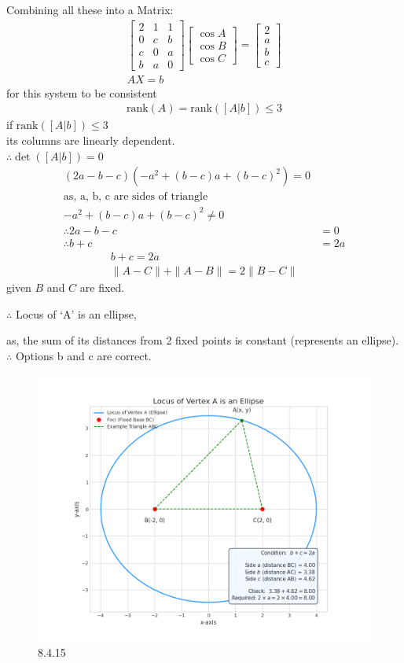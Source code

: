 \documentclass[journal]{IEEEtran}
\begin{document}
Combining all these into a Matrix:
\begin{align}\begin{bmatrix}2 & 1 & 1 \\0 & c & b \\c & 0 & a \\b & a & 0\end{bmatrix}\begin{bmatrix}\cos A \\\cos B \\\cos C\end{bmatrix}=\begin{bmatrix}2 \\a \\b \\c\end{bmatrix}\\
AX = b
\end{align}
for this system to be consistent
\begin{align}
\text{rank}(A) = \text{rank}([A|b]) \leq 3
\end{align}
if $\text{rank}([A|b]) \leq 3$\\ its columns are linearly dependent.\\
$\therefore \det([A|b]) = 0$
\begin{align}
(2a - b - c)(-a^2 + (b-c)a + (b-c)^2) = 0\\
\text{as, a, b, c are sides of triangle}\\
-a^2 + (b-c)a + (b-c)^2 \neq 0\\
\therefore 2a - b - c &= 0 \\
\therefore b + c &= 2a
\end{align}
\begin{align}
b + c = 2a\\
\| A - C \| + \| A - B \| = 2 \| B - C \|
\end{align}
given $B$ and $C$ are fixed.

$\therefore$ Locus of `A' is an ellipse,

as, the sum of its distances from 2 fixed points is constant (represents an ellipse).\\
$\therefore$ Options b and c are correct.

\begin{figure}[H]
    \centering
    \includegraphics[width=0.85\columnwidth]{figs/graph15.png}
    \caption{8.4.15}
    \label{fig:placeholder}
\end{figure}
\end{document}
